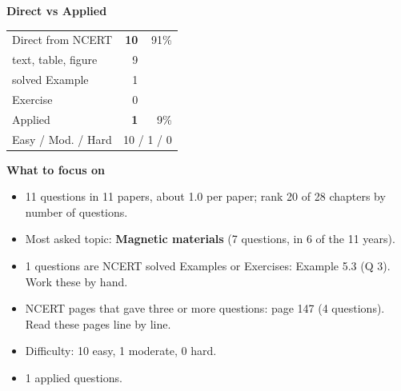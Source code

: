 \begin{minipage}[t]{0.34\linewidth}{\small\textbf{\color{crimson}Direct vs Applied}\par\smallskip
\begin{tabular}{@{}lrr@{}}\toprule
Direct from NCERT & \textbf{10} & 91\%\\
\quad text, table, figure & 9 &\\
\quad solved Example & 1 &\\
\quad Exercise & 0 &\\
Applied & \textbf{1} & 9\%\\\midrule
Easy / Mod. / Hard & \multicolumn{2}{r}{10 / 1 / 0}\\\bottomrule
\end{tabular}}\end{minipage}\hfill
\begin{minipage}[t]{0.63\linewidth}{\small\textbf{\color{crimson}What to focus on}\par\smallskip
\begin{itemize}[leftmargin=1.1em,itemsep=1pt,topsep=0pt]
\item 11 questions in 11 papers, about 1.0 per paper; rank 20 of 28 chapters by number of questions.
\item Most asked topic: \textbf{Magnetic materials} (7 questions, in 6 of the 11 years).
\item 1 questions are NCERT solved Examples or Exercises: Example 5.3 (Q 3). Work these by hand.
\item NCERT pages that gave three or more questions: page 147 (4 questions). Read these pages line by line.
\item Difficulty: 10 easy, 1 moderate, 0 hard.
\item 1 applied questions.
\end{itemize}}\end{minipage}\par
{}
